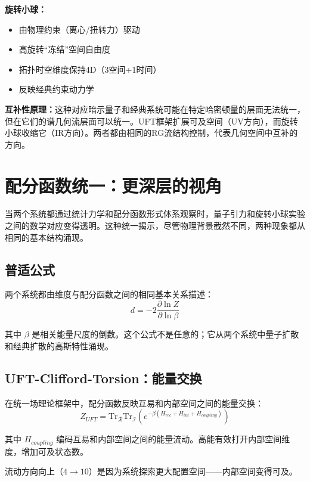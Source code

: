 \documentclass[12pt,a4paper]{article}
\begin{document}
\textbf{旋转小球：}
\begin{itemize}
    \item 由物理约束（离心/扭转力）驱动
    \item 高旋转``冻结''空间自由度
    \item 拓扑时空维度保持4D（3空间+1时间）
    \item 反映经典约束动力学
\end{itemize}

\textbf{互补性原理：}这种对应暗示量子和经典系统可能在特定哈密顿量的层面无法统一，但在它们的谱几何流层面可以统一。UFT框架扩展可及空间（UV方向），而旋转小球收缩它（IR方向）。两者都由相同的RG流结构控制，代表几何空间中互补的方向。

\section{配分函数统一：更深层的视角}
\label{sec:partition}

当两个系统都通过统计力学和配分函数形式体系观察时，量子引力和旋转小球实验之间的数学对应变得透明。这种统一揭示，尽管物理背景截然不同，两种现象都从相同的基本结构涌现。

\subsection{普适公式}

两个系统都由维度与配分函数之间的相同基本关系描述：
\begin{equation}
    d = -2 \frac{\partial \ln Z}{\partial \ln \beta}
    \label{eq:universal_dimension}
\end{equation}

其中 $\beta$ 是相关能量尺度的倒数。这个公式不是任意的；它从两个系统中量子扩散和经典扩散的高斯特性涌现。

\subsection{UFT-Clifford-Torsion：能量交换}

在统一场理论框架中，配分函数反映互易和内部空间之间的能量交换：
\begin{equation}
    Z_{UFT} = \text{Tr}_{\mathcal{R}} \text{Tr}_{\mathcal{I}} \left(e^{-\beta (H_{rec} + H_{int} + H_{coupling})}\right)
\end{equation}

其中 $H_{coupling}$ 编码互易和内部空间之间的能量流动。高能有效打开内部空间维度，增加可及状态数。

流动方向向上（$4 \to 10$）是因为系统探索更大配置空间——内部空间变得可及。
\end{document}
